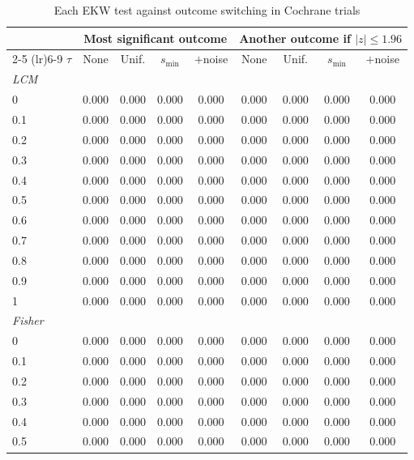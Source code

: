 \begin{table}[htbp]
\centering
\caption{Each EKW test against outcome switching in Cochrane trials}
\label{tab:cochrane_switching_power_EKW}
\footnotesize
\setlength{\tabcolsep}{4pt}
\begin{tabular}{lcccccccc}
\toprule
 & \multicolumn{4}{c}{Most significant outcome} & \multicolumn{4}{c}{Another outcome if $|z| \le 1.96$} \\
\cmidrule(lr){2-5} \cmidrule(lr){6-9}
$\tau$ & None & Unif. & $s_{\min}$ & $+$noise & None & Unif. & $s_{\min}$ & $+$noise \\
\midrule
\multicolumn{9}{l}{\textit{LCM}} \\
0 & 0.000 & 0.000 & 0.000 & 0.000 & 0.000 & 0.000 & 0.000 & 0.000 \\
0.1 & 0.000 & 0.000 & 0.000 & 0.000 & 0.000 & 0.000 & 0.000 & 0.000 \\
0.2 & 0.000 & 0.000 & 0.000 & 0.000 & 0.000 & 0.000 & 0.000 & 0.000 \\
0.3 & 0.000 & 0.000 & 0.000 & 0.000 & 0.000 & 0.000 & 0.000 & 0.000 \\
0.4 & 0.000 & 0.000 & 0.000 & 0.000 & 0.000 & 0.000 & 0.000 & 0.000 \\
0.5 & 0.000 & 0.000 & 0.000 & 0.000 & 0.000 & 0.000 & 0.000 & 0.000 \\
0.6 & 0.000 & 0.000 & 0.000 & 0.000 & 0.000 & 0.000 & 0.000 & 0.000 \\
0.7 & 0.000 & 0.000 & 0.000 & 0.000 & 0.000 & 0.000 & 0.000 & 0.000 \\
0.8 & 0.000 & 0.000 & 0.000 & 0.000 & 0.000 & 0.000 & 0.000 & 0.000 \\
0.9 & 0.000 & 0.000 & 0.000 & 0.000 & 0.000 & 0.000 & 0.000 & 0.000 \\
1 & 0.000 & 0.000 & 0.000 & 0.000 & 0.000 & 0.000 & 0.000 & 0.000 \\
\midrule
\multicolumn{9}{l}{\textit{Fisher}} \\
0 & 0.000 & 0.000 & 0.000 & 0.000 & 0.000 & 0.000 & 0.000 & 0.000 \\
0.1 & 0.000 & 0.000 & 0.000 & 0.000 & 0.000 & 0.000 & 0.000 & 0.000 \\
0.2 & 0.000 & 0.000 & 0.000 & 0.000 & 0.000 & 0.000 & 0.000 & 0.000 \\
0.3 & 0.000 & 0.000 & 0.000 & 0.000 & 0.000 & 0.000 & 0.000 & 0.000 \\
0.4 & 0.000 & 0.000 & 0.000 & 0.000 & 0.000 & 0.000 & 0.000 & 0.000 \\
0.5 & 0.000 & 0.000 & 0.000 & 0.000 & 0.000 & 0.000 & 0.000 & 0.000 \\

\end{tabular}
\end{table}
